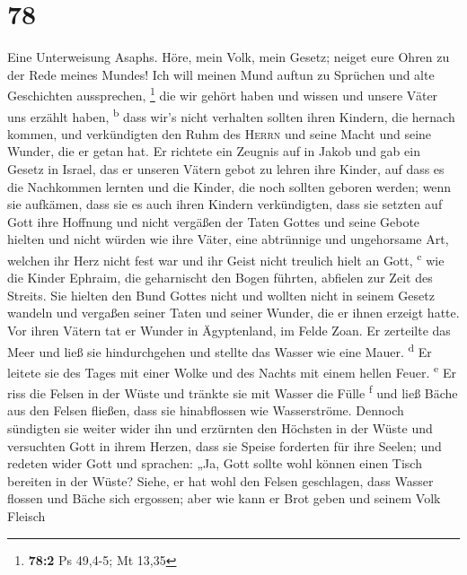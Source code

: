 \hypertarget{section-77}{%
\section{78}\label{section-77}}

 Eine Unterweisung Asaphs. Höre, mein Volk, mein Gesetz;
neiget eure Ohren zu der Rede meines Mundes!  Ich will
meinen Mund auftun zu Sprüchen und alte Geschichten aussprechen,
\footnote{\textbf{78:2} Ps 49,4-5; Mt 13,35}  die wir
gehört haben und wissen und unsere Väter uns erzählt haben,
\textsuperscript{b}  dass wir's nicht verhalten sollten
ihren Kindern, die hernach kommen, und verkündigten den Ruhm des
\textsc{Herrn} und seine Macht und seine Wunder, die er getan hat.
 Er richtete ein Zeugnis auf in Jakob und gab ein Gesetz
in Israel, das er unseren Vätern gebot zu lehren ihre Kinder,
 auf dass es die Nachkommen lernten und die Kinder, die
noch sollten geboren werden; wenn sie aufkämen, dass sie es auch ihren
Kindern verkündigten,  dass sie setzten auf Gott ihre
Hoffnung und nicht vergäßen der Taten Gottes und seine Gebote hielten
 und nicht würden wie ihre Väter, eine abtrünnige und
ungehorsame Art, welchen ihr Herz nicht fest war und ihr Geist nicht
treulich hielt an Gott, \textsuperscript{c}  wie die
Kinder Ephraim, die geharnischt den Bogen führten, abfielen zur Zeit des
Streits.  Sie hielten den Bund Gottes nicht und wollten
nicht in seinem Gesetz wandeln  und vergaßen seiner Taten
und seiner Wunder, die er ihnen erzeigt hatte.  Vor ihren
Vätern tat er Wunder in Ägyptenland, im Felde Zoan.  Er
zerteilte das Meer und ließ sie hindurchgehen und stellte das Wasser wie
eine Mauer. \textsuperscript{d}  Er leitete sie des Tages
mit einer Wolke und des Nachts mit einem hellen Feuer.
\textsuperscript{e}  Er riss die Felsen in der Wüste und
tränkte sie mit Wasser die Fülle \textsuperscript{f}  und
ließ Bäche aus den Felsen fließen, dass sie hinabflossen wie
Wasserströme.  Dennoch sündigten sie weiter wider ihn und
erzürnten den Höchsten in der Wüste  und versuchten Gott
in ihrem Herzen, dass sie Speise forderten für ihre Seelen;
 und redeten wider Gott und sprachen: „Ja, Gott sollte
wohl können einen Tisch bereiten in der Wüste?  Siehe, er
hat wohl den Felsen geschlagen, dass Wasser flossen und Bäche sich
ergossen; aber wie kann er Brot geben und seinem Volk Fleisch
